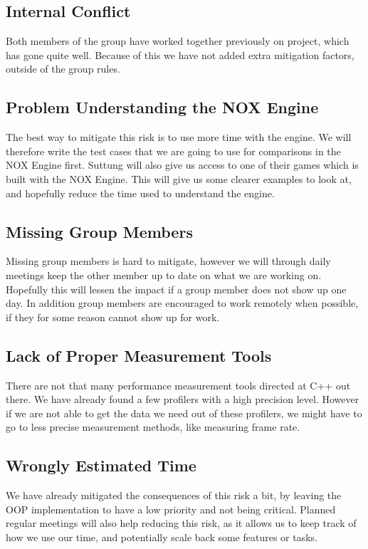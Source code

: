 \subsection*{Internal Conflict}
Both members of the group have worked together previously on project,
which has gone quite well. 
Because of this we have not added extra mitigation factors, 
outside of the group rules.

\subsection*{Problem Understanding the NOX Engine}
The best way to mitigate this risk is to use more time with the engine.
We will therefore write the test cases that we are
going to use for comparisons in the NOX Engine first.
Suttung will also give us access to one of their games which is built with the NOX Engine.
This will give us some clearer examples to look at, and hopefully reduce the time 
used to understand the engine.

\subsection*{Missing Group Members}
Missing group members is hard to mitigate, however 
we will through daily meetings keep the other member
up to date on what we are working on. 
Hopefully this will lessen the impact if a group member
does not show up one day.
In addition group members are encouraged to work remotely when possible,
if they for some reason cannot show up for work.

\subsection*{Lack of Proper Measurement Tools}
There are not that many performance measurement tools
directed at C++ out there. 
We have already found a few profilers with a high precision level. 
However if we are not able to get the data we need out of these profilers,
we might have to go to less precise measurement methods,
like measuring frame rate.

\subsection*{Wrongly Estimated Time}
We have already mitigated the consequences of this risk a bit, by leaving the OOP
implementation to have a low priority and not being critical.
Planned regular meetings will also help reducing this risk, as it allows us to keep 
track of how we use our time, and potentially scale back some features or tasks.
